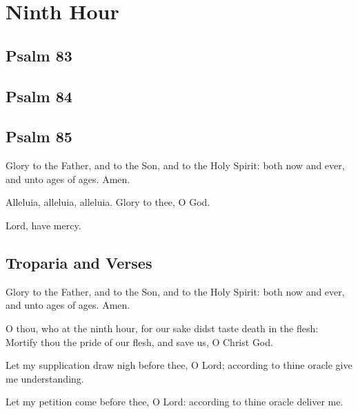 \section{Ninth Hour}



\subsection{Psalm 83}



\subsection{Psalm 84}



\subsection{Psalm 85}



Glory to the Father, and to the Son, and to the Holy Spirit: both now and ever, and unto ages of ages. Amen.

Alleluia, alleluia, alleluia. Glory to thee, O God. 

Lord, have mercy. 

\subsection{Troparia and Verses}


Glory to the Father, and to the Son, and to the Holy Spirit: both now and ever, and unto ages of ages. Amen.

O thou, who at the ninth hour, for our sake didst taste death in the flesh: Mortify thou the pride of our flesh, and save us, O Christ God. 

 Let my supplication draw nigh before thee, O Lord; according to thine oracle give me understanding. 

 Let my petition come before thee, O Lord: according to thine oracle deliver me. 

